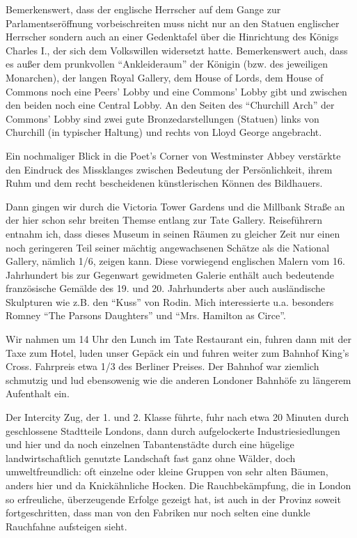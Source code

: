 Bemerkenswert, dass der englische Herrscher auf dem Gange zur Parlamentseröffnung vorbeischreiten muss nicht nur an den Statuen englischer Herrscher sondern auch an einer Gedenktafel über die Hinrichtung des Königs Charles I., der sich dem Volkswillen widersetzt hatte. Bemerkenswert auch, dass es außer dem prunkvollen \enquote{Ankleideraum} der Königin (bzw. des jeweiligen Monarchen), der langen Royal Gallery, dem House of Lords, dem House of Commons noch eine Peers' Lobby und eine Commons' Lobby gibt und zwischen den beiden noch eine Central Lobby. An den Seiten des \enquote{Churchill Arch} der Commons' Lobby sind zwei gute Bronzedarstellungen (Statuen) links von Churchill (in typischer Haltung) und rechts von Lloyd George angebracht.

Ein nochmaliger Blick in die Poet's Corner von Westminster Abbey verstärkte den Eindruck des Missklanges zwischen Bedeutung der Persönlichkeit, ihrem Ruhm und dem recht bescheidenen künstlerischen Können des Bildhauers.

Dann gingen wir durch die Victoria Tower Gardens und die Millbank Straße an der hier schon sehr breiten Themse entlang zur Tate Gallery. Reiseführern entnahm ich, dass dieses Museum in seinen Räumen zu gleicher Zeit nur einen noch geringeren Teil seiner mächtig angewachsenen Schätze als die National Gallery, nämlich 1/6, zeigen kann. Diese vorwiegend englischen Malern vom 16. Jahrhundert bis zur Gegenwart gewidmeten Galerie enthält auch bedeutende französische Gemälde des 19. und 20. Jahrhunderts aber auch ausländische Skulpturen wie z.B. den \enquote{Kuss} von Rodin. Mich interessierte u.a. besonders Romney \enquote{The Parsons Daughters} und \enquote{Mrs. Hamilton as Circe}.

Wir nahmen um 14 Uhr den Lunch im Tate Restaurant ein, fuhren dann mit der Taxe zum Hotel, luden unser Gepäck ein und fuhren weiter zum Bahnhof King's Cross. Fahrpreis etwa 1/3 des Berliner Preises. Der Bahnhof war ziemlich schmutzig und lud ebensowenig wie die anderen Londoner Bahnhöfe zu längerem Aufenthalt ein.

Der Intercity Zug, der 1. und 2. Klasse führte, fuhr nach etwa 20 Minuten durch geschlossene Stadtteile Londons, dann durch aufgelockerte Industriesiedlungen und hier und da noch einzelnen Tabantenstädte durch eine hügelige landwirtschaftlich genutzte Landschaft fast ganz ohne Wälder, doch umweltfreundlich: oft einzelne oder kleine Gruppen von sehr alten Bäumen, anders hier und da Knickähnliche Hocken. Die Rauchbekämpfung, die in London so erfreuliche, überzeugende Erfolge gezeigt hat, ist auch in der Provinz soweit fortgeschritten, dass man von den Fabriken nur noch selten eine dunkle Rauchfahne aufsteigen sieht.


